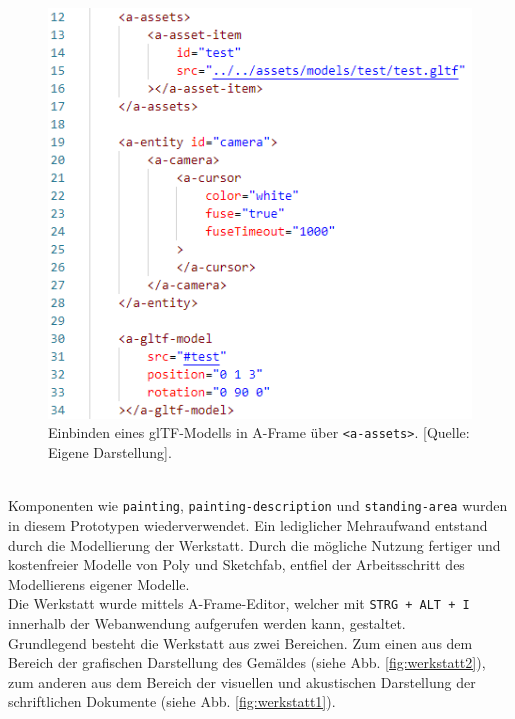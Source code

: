 \documentclass[a4paper,12pt,oneside]{article}
\begin{document}
        \begin{figure}
          \centering
          \includegraphics{img/coding/gltf1.png}
          \caption[Einbinden eines glTF-Modells in A-Frame über \texttt{<a-assets>}.]{Einbinden eines glTF-Modells in A-Frame über \texttt{<a-assets>}. [Quelle: Eigene Darstellung].}
          \label{fig:gltf1}
        \end{figure} \\
        Komponenten wie \texttt{painting}, \texttt{painting-description} und 
        \texttt{standing-area} wurden in diesem Prototypen wiederverwendet. 
        Ein lediglicher Mehraufwand entstand durch die Modellierung
        der Werkstatt.
        Durch die mögliche Nutzung fertiger und kostenfreier Modelle
        von Poly und Sketchfab, entfiel der 
        Arbeitsschritt des Modellierens eigener Modelle. \\
        Die Werkstatt wurde mittels A-Frame-Editor, welcher mit \texttt{STRG + ALT + I}
        innerhalb der Webanwendung aufgerufen werden kann, gestaltet. \\
        Grundlegend besteht die Werkstatt aus zwei Bereichen. Zum einen 
        aus dem Bereich der grafischen Darstellung des Gemäldes
        (siehe Abb. \ref{fig:werkstatt2}),
        zum anderen aus dem Bereich der visuellen und akustischen 
        Darstellung der schriftlichen Dokumente
        (siehe Abb. \ref{fig:werkstatt1}).
\end{document}
